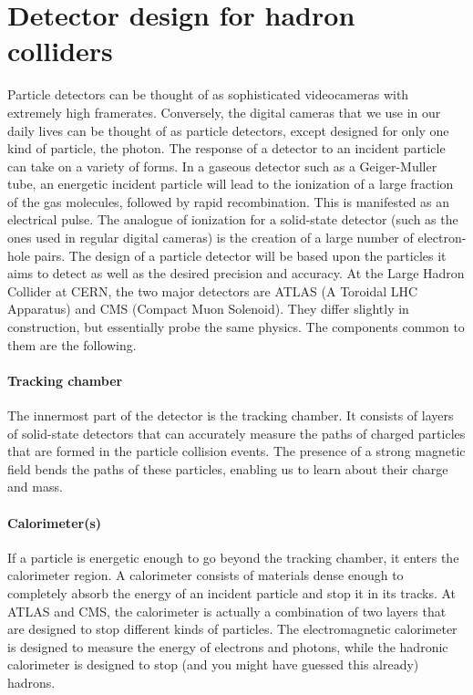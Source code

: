 \section{Detector design for hadron colliders}
Particle detectors can be thought of as sophisticated videocameras with extremely high framerates. Conversely, the digital cameras that we use in our daily lives can be thought of as particle detectors, except designed for only one kind of particle, the photon. The response of a detector to an incident particle can take on a variety of forms. In a gaseous detector such as a  Geiger-Muller tube, an energetic incident particle will lead to the ionization of a large fraction of the gas molecules, followed by rapid recombination. This is manifested as an electrical pulse. The analogue of ionization for a solid-state detector (such as the ones used in regular digital cameras) is the creation of a large number of electron-hole pairs. The design of a particle detector will be based upon the particles it aims to detect as well as the desired precision and accuracy.
At the Large Hadron Collider at CERN, the two major detectors are ATLAS (A Toroidal LHC Apparatus) and CMS (Compact Muon Solenoid). They differ slightly in construction, but essentially probe the same physics. The components common to them are the following.
\paragraph{Tracking chamber}
The innermost part of the detector is the tracking chamber. It consists of layers of solid-state detectors that can accurately measure the paths of charged particles that are formed in the particle collision events. The presence of a strong magnetic field bends the paths of these particles, enabling us to learn about their charge and mass.
\paragraph{Calorimeter(s)}
If a particle is energetic enough to go beyond the tracking chamber, it enters the calorimeter region. A calorimeter consists of materials dense enough to completely absorb the energy of an incident particle and stop it in its tracks. At ATLAS and CMS, the calorimeter is actually a combination of two layers that are designed to stop different kinds of particles. The electromagnetic calorimeter is designed to measure the energy of electrons and photons, while the hadronic calorimeter is designed to stop (and you might have guessed this already) hadrons. 
